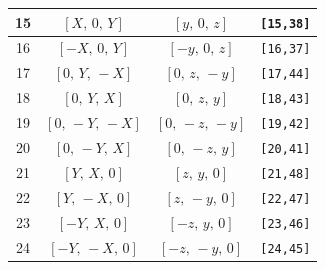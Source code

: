 \documentclass[fleqn,8pt]{jsarticle}
\begin{document}
\begin{longtable}{cccc}
15 & $\left[ X,\, 0,\, Y \right]$ & $\left[ y,\, 0,\, z \right]$ & {\tt [15,38]} \\ \hline
16 & $\left[ - X,\, 0,\, Y \right]$ & $\left[ - y,\, 0,\, z \right]$ & {\tt [16,37]} \\ \hline
17 & $\left[ 0,\, Y,\, - X \right]$ & $\left[ 0,\, z,\, - y \right]$ & {\tt [17,44]} \\ \hline
18 & $\left[ 0,\, Y,\, X \right]$ & $\left[ 0,\, z,\, y \right]$ & {\tt [18,43]} \\ \hline
19 & $\left[ 0,\, - Y,\, - X \right]$ & $\left[ 0,\, - z,\, - y \right]$ & {\tt [19,42]} \\ \hline
20 & $\left[ 0,\, - Y,\, X \right]$ & $\left[ 0,\, - z,\, y \right]$ & {\tt [20,41]} \\ \hline
21 & $\left[ Y,\, X,\, 0 \right]$ & $\left[ z,\, y,\, 0 \right]$ & {\tt [21,48]} \\ \hline
22 & $\left[ Y,\, - X,\, 0 \right]$ & $\left[ z,\, - y,\, 0 \right]$ & {\tt [22,47]} \\ \hline
23 & $\left[ - Y,\, X,\, 0 \right]$ & $\left[ - z,\, y,\, 0 \right]$ & {\tt [23,46]} \\ \hline
24 & $\left[ - Y,\, - X,\, 0 \right]$ & $\left[ - z,\, - y,\, 0 \right]$ & {\tt [24,45]} \\
\end{longtable}
\renewcommand{\arraystretch}{1.2}
\end{document}
